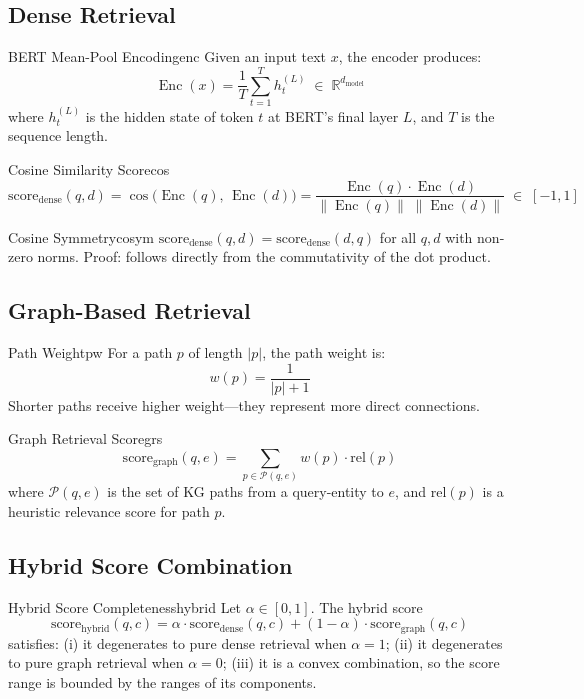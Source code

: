 \documentclass[12pt,a4paper]{article}
\newcommand{\Enc}{\operatorname{Enc}}
\newcommand{\R}{\mathbb{R}}
\begin{document}
\subsection{Dense Retrieval}

\begin{definition}{BERT Mean-Pool Encoding}{enc}
Given an input text $x$, the encoder produces:
\[
  \Enc(x) = \frac{1}{T}\sum_{t=1}^{T} h_t^{(L)}
  \;\in\; \R^{d_{\text{model}}}
\]
where $h_t^{(L)}$ is the hidden state of token $t$ at BERT's final layer $L$,
and $T$ is the sequence length.
\end{definition}

\begin{definition}{Cosine Similarity Score}{cos}
\[
  \text{score}_{\text{dense}}(q, d)
  = \cos\!\bigl(\Enc(q),\,\Enc(d)\bigr)
  = \frac{\Enc(q)\cdot\Enc(d)}{\|\Enc(q)\|\;\|\Enc(d)\|}
  \;\in\; [-1, 1]
\]
\end{definition}

\begin{lemma}{Cosine Symmetry}{cosym}
$\text{score}_{\text{dense}}(q,d) = \text{score}_{\text{dense}}(d,q)$
for all $q, d$ with non-zero norms. Proof: follows directly from the commutativity
of the dot product.
\end{lemma}

\subsection{Graph-Based Retrieval}

\begin{definition}{Path Weight}{pw}
For a path $p$ of length $|p|$, the path weight is:
\[
  w(p) = \frac{1}{|p|+1}
\]
Shorter paths receive higher weight---they represent more direct connections.
\end{definition}

\begin{definition}{Graph Retrieval Score}{grs}
\[
  \text{score}_{\text{graph}}(q, e)
  = \sum_{p \in \mathcal{P}(q, e)} w(p) \cdot \text{rel}(p)
\]
where $\mathcal{P}(q,e)$ is the set of KG paths from a query-entity to $e$,
and $\text{rel}(p)$ is a heuristic relevance score for path $p$.
\end{definition}

\subsection{Hybrid Score Combination}

\begin{theorem}{Hybrid Score Completeness}{hybrid}
Let $\alpha \in [0,1]$. The hybrid score
\[
  \boxed{\text{score}_{\text{hybrid}}(q, c)
  = \alpha \cdot \text{score}_{\text{dense}}(q, c)
  + (1-\alpha) \cdot \text{score}_{\text{graph}}(q, c)}
\]
satisfies: (i) it degenerates to pure dense retrieval when $\alpha=1$;
(ii) it degenerates to pure graph retrieval when $\alpha=0$;
(iii) it is a convex combination, so the score range is bounded by the
ranges of its components.
\end{theorem}
\end{document}
